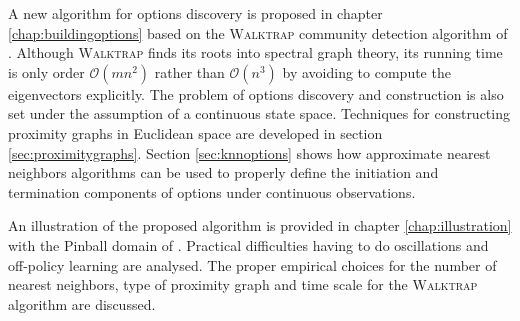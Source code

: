 A new algorithm for options discovery is proposed in chapter \ref{chap:buildingoptions} based on the  \textsc{Walktrap} community detection algorithm of \cite{Pons2005}. Although \textsc{Walktrap} finds its roots into spectral graph theory, its running time is only order $\mathcal{O}(mn^2)$ rather than $\mathcal{O}(n^3)$ by avoiding to compute the eigenvectors explicitly. The problem of options discovery and construction is also set under the assumption of a continuous state space. Techniques for constructing proximity graphs in Euclidean space are developed in section \ref{sec:proximitygraphs}. Section \ref{sec:knnoptions} shows how approximate nearest neighbors algorithms can be used to properly define the initiation and termination components of options under continuous observations.

An illustration of the proposed algorithm is provided in chapter \ref{chap:illustration} with the Pinball domain of \cite{Konidaris2009}. Practical difficulties having to do oscillations and off-policy learning are analysed. The proper empirical choices for the number of nearest neighbors, type of proximity graph and time scale for the \textsc{Walktrap} algorithm are discussed.